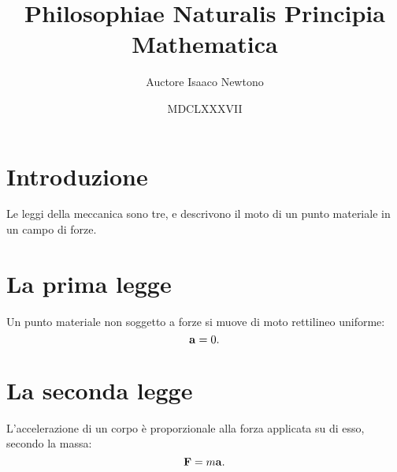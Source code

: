 \documentclass{article}
\title{Philosophiae Naturalis Principia Mathematica}
\author{Auctore Isaaco Newtono}
\date{MDCLXXXVII}
\begin{document}
\maketitle

\section{Introduzione}
Le leggi della meccanica sono tre, e descrivono il moto di un punto materiale in un campo di forze.

\section{La prima legge}
Un punto materiale non soggetto a forze si muove di moto rettilineo uniforme:
\begin{equation}
	\vb a = 0.
\end{equation}

\section{La seconda legge}
L'accelerazione di un corpo \`e proporzionale alla forza applicata su di esso, secondo la massa:
\begin{equation}
	\vb F = m \vb a.
\end{equation}
\end{document}
